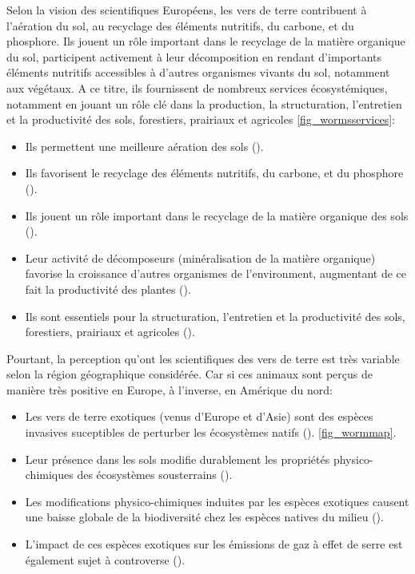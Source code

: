 \documentclass{book}
\begin{document}
\noindent
 Selon la vision des scientifiques Européens, les vers de terre contribuent à l'aération du sol, au recyclage des éléments nutritifs, du carbone, et du phosphore. Ils jouent un rôle important dans le recyclage de la matière organique du sol, participent activement à leur décomposition en rendant d'importants éléments nutritifs accessibles à d'autres organismes vivants du sol, notamment aux végétaux. A ce titre, ils fournissent de nombreux services écosystémiques, notamment en jouant un rôle clé dans la production, la structuration, l'entretien et la productivité des sols, forestiers, prairiaux et agricoles \cref{fig_wormsservices}\cite{11_EW_benefits_summary}:

{
\renewcommand{\labelitemi}{\textbullet}
\begin{itemize}
    \item Ils permettent une meilleure aération des sols (\cite{1_aeration_sols}).
    \item Ils favorisent le recyclage des éléments nutritifs, du carbone, et du phosphore (\cite{2_recyclage_elements_nutri}).
    \item Ils jouent un rôle important dans le recyclage de la matière organique des sols (\cite{3_recyclage_matiere_orga}).
    \item Leur activité de décomposeurs (minéralisation de la matière organique) favorise la croissance d'autres organismes de l'environment, augmentant de ce fait la productivité des plantes (\cite{4_augmentation_productivite_revue}).
    \item Ils sont essentiels pour la structuration, l'entretien et la productivité des sols, forestiers, prairiaux et agricoles (\cite{5_structuration_des_sols}).
\end{itemize}
} %
Pourtant, la perception qu'ont les scientifiques des vers de terre est très variable selon la région géographique considérée. Car si ces animaux sont perçus de manière très positive en Europe, à l'inverse, en Amérique du nord:
{
\renewcommand{\labelitemi}{\textbullet}
\begin{itemize}
    \item Les vers de terre exotiques (venus d'Europe et d'Asie) sont des espèces invasives suceptibles de perturber les écosystèmes natifs (\cite{6_invasion_vers_de_terre}). \cref{fig_wormmap}.
    \item Leur présence dans les sols modifie durablement les propriétés physico-chimiques des écosystèmes sousterrains (\cite{7_EW_change_soil_chemical_properties}).
    \item Les modifications physico-chimiques induites par les espèces exotiques causent une baisse globale de la biodiversité chez les espèces natives du milieu (\cite{8_EW_erode_soil_biodiversity}).
    \item L'impact de ces espèces exotiques sur les émissions de gaz à effet de serre est également sujet à controverse (\cite{9_EW_effet_serre,10_EW_pas_effet_de_serre}).
\end{itemize}
}
\end{document}
